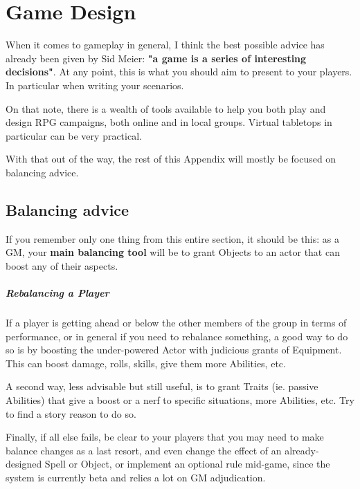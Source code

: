 \chapter{Game Design}

When it comes to gameplay in general, I think the best possible advice has already been given by Sid Meier: \textbf{"a game is a series of interesting decisions"}. At any point, this is what you should aim to present to your players. In particular when writing your scenarios.

On that note, there is a wealth of tools available to help you both play and design RPG campaigns, both online and in local groups. Virtual tabletops in particular can be very practical.

With that out of the way, the rest of this Appendix will mostly be focused on balancing advice.


\section{Balancing advice}


\begin{rpg-examplebox}
    If you remember only one thing from this entire section, it should be this: as a GM, your \textbf{main balancing tool} will be to grant Objects to an actor that can boost any of their aspects.
\end{rpg-examplebox}


\paragraph{Rebalancing a Player}

If a player is getting ahead or below the other members of the group in terms of performance, or in general if you need to rebalance something, a good way to do so is by boosting the under-powered Actor with judicious grants of Equipment. This can boost damage, rolls, skills, give them more Abilities, etc.
    
A second way, less advisable but still useful, is to grant Traits (ie. passive Abilities) that give a boost or a nerf to specific situations, more Abilities, etc. Try to find a story reason to do so.
    
Finally, if all else fails, be clear to your players that you may need to make balance changes as a last resort, and even change the effect of an already-designed Spell or Object, or implement an optional rule mid-game, since the system is currently beta and relies a lot on GM adjudication.

